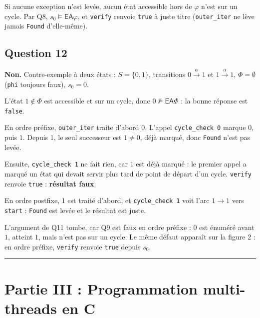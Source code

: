 \documentclass[11pt,a4paper]{article}
\providecommand{\varnothing}{\emptyset}
\newcommand{\equationajustee}[1]{%
  \sbox{\boiteequation}{$\displaystyle #1$}%
  \ifdim\wd\boiteequation>\linewidth
    \[\resizebox{\linewidth}{!}{\usebox{\boiteequation}}\]%
  \else
    \[#1\]%
  \fi}
\begin{document}
Si aucune exception n'est levée, aucun état accessible hors de \(\varphi\) n'est sur un cycle. Par Q8, \(s_0\models\mathsf{EA}\varphi\), et \texttt{verify} renvoie \texttt{true} à juste titre (\texttt{outer\_iter} ne lève jamais \texttt{Found} d'elle-même).

\equationajustee{\boxed{\texttt{verify t phi s0} = \texttt{true} \iff s_0\models\mathsf{EA}\,\varphi}}

\hypertarget{question-12}{%
\subsection{Question 12}\label{question-12}}

\textbf{Non.} Contre-exemple à deux états : \(S=\{0,1\}\), transitions \(0\xrightarrow{\alpha}1\) et \(1\xrightarrow{\alpha}1\), \(\Phi=\varnothing\) (\texttt{phi} toujours faux), \(s_0=0\).

L'état \(1\notin\Phi\) est accessible et sur un cycle, donc \(0\not\models\mathsf{EA}\Phi\) : la bonne réponse est \texttt{false}.

En ordre préfixe, \texttt{outer\_iter} traite d'abord \(0\). L'appel \texttt{cycle\_check\ 0} marque \(0\), puis \(1\). Depuis \(1\), le seul successeur est \(1\neq0\), déjà marqué, donc \texttt{Found} n'est pas levée.

Ensuite, \texttt{cycle\_check\ 1} ne fait rien, car \(1\) est déjà marqué : le premier appel a marqué un état qui devait servir plus tard de point de départ d'un cycle. \texttt{verify} renvoie \texttt{true} : \textbf{résultat faux}.

En ordre postfixe, \(1\) est traité d'abord, et \texttt{cycle\_check\ 1} voit l'arc \(1\to1\) vers \texttt{start} : \texttt{Found} est levée et le résultat est juste.

L'argument de Q11 tombe, car Q9 est faux en ordre préfixe : \(0\) est énuméré avant \(1\), atteint \(1\), mais n'est pas sur un cycle. Le même défaut apparaît sur la figure 2 : en ordre préfixe, \texttt{verify} renvoie \texttt{true} depuis \(s_0\).

\begin{center}\rule{0.5\linewidth}{0.5pt}\end{center}

\hypertarget{partie-iii-programmation-multi-threads-en-c}{%
\section{Partie III : Programmation multi-threads en C}\label{partie-iii-programmation-multi-threads-en-c}}
\end{document}
